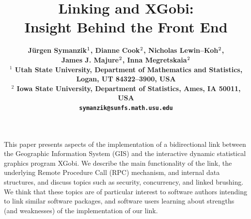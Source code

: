 








\renewcommand{\topfraction}{1.0}
\renewcommand{\dbltopfraction}{1.0}
\renewcommand{\bottomfraction}{1.0}
\renewcommand{\textfraction}{0.0}
\textfloatsep 0.1in
\dbltextfloatsep 0.1in



\nocite{As85,AB96,AB97,ADH93,AD98,BDLS96,%
BA86b,BCW88,BH92b,BC96,BCS96,Bao97,BA97,Chau82,Cha97,Cha98,%
CCMS94,CMSC96,CSMC97,Co91,Cr84,Cr93,CLNL87,COW92,%
DRMVKSD94,Dyk96,EE98,ESRI96,GHW92,GMSBK97,Gue98,%
HaBr91b,HKT95,HBCUW91,HMW96,KM94,LSDB92,%
MacD92,Math96,MCCKLS95,MCCKLSv95,MCCS96,MCSMv96,MC98,MW87,Mon88,Mon89,%
Nye92,OP96,OPR96,Pajarola:98th,Pan96,RMJF92,Sc94,St90,SCB98,%
SMCC94,SMC95,SMCv95,SMMC96Int,SMC96ACM,%
SMC97IASC,SKSKCS97Int,SKSCL97ASA,SCKL98Army,SPW98ASA,UWH90,WLB90,ZG97}


\title{\Large\bf Linking \ArcViewTHREEZEROTM\/ and XGobi:\\
Insight Behind the Front End}
\author{\normalsize\bf J\"urgen Symanzik$^{\normalsize 1}$, 
Dianne Cook$^{\normalsize 2}$,
Nicholas Lewin--Koh$^{\normalsize 2}$, \\
\normalsize\bf James J. Majure$^{\normalsize 2}$,
Inna Megretskaia$^{\normalsize 2}$\\
{\small {\normalsize $^1$} Utah State University, Department of
Mathematics and Statistics, Logan, UT 84322--3900, USA}\\
{\small {\normalsize $^2$} Iowa State University, 
Department of Statistics, Ames, IA 50011, USA}\\
{\small \tt symanzik@sunfs.math.usu.edu}}
\date{}
\maketitle

\vspace{-0.2in} \abstract This paper presents aspects of the
implementation of a bidirectional link between the Geographic
Information System (GIS) \ArcViewTHREEZEROTMfn\/ and the interactive
dynamic statistical graphics program XGobi. We describe the main
functionality of the link, the underlying Remote Procedure
Call (RPC) mechanism, and internal data structures, and discuss
topics such as security, concurrency, and linked brushing. We think
that these topics are of particular interest to software authors
intending to link similar software packages, and software users
learning about strengths (and weaknesses) of the implementation of our
link.

